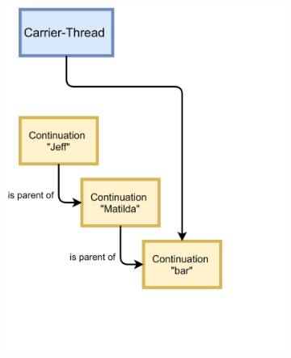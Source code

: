 \begin{figure}[H]
    \centering
    \begin{subfigure}[b]{0.45\textwidth}
        \includegraphics[width=1.0\linewidth]{img/before-run-changes-current-continuation.png}
        \label{Before Carrier-Thread's Continuation gets updated}
    \end{subfigure}
    \begin{subfigure}[b]{0.45\textwidth}

\end{subfigure}
\end{figure}
